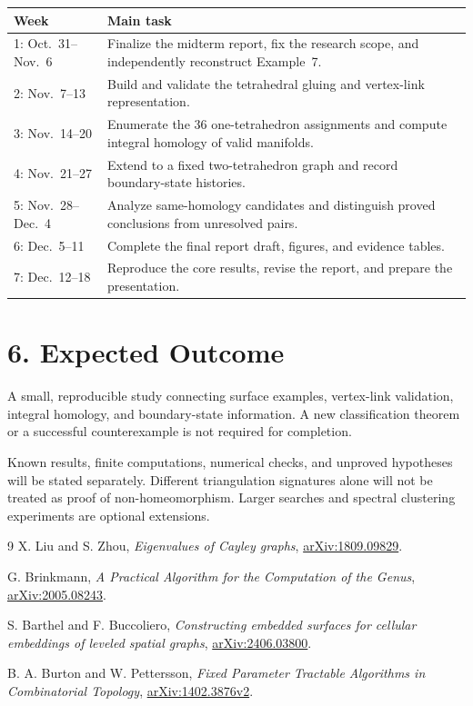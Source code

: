 \documentclass[11pt,a4paper]{article}
\begin{document}
\renewcommand{\arraystretch}{1.35}
\begin{tabularx}{\textwidth}{@{}p{2.8cm}X@{}}
\toprule
\textbf{Week} & \textbf{Main task}\\
\midrule
1: Oct.\ 31--Nov.\ 6 & Finalize the midterm report, fix the research scope, and independently reconstruct Example~7.\\
2: Nov.\ 7--13 & Build and validate the tetrahedral gluing and vertex-link representation.\\
3: Nov.\ 14--20 & Enumerate the $36$ one-tetrahedron assignments and compute integral homology of valid manifolds.\\
4: Nov.\ 21--27 & Extend to a fixed two-tetrahedron graph and record boundary-state histories.\\
5: Nov.\ 28--Dec.\ 4 & Analyze same-homology candidates and distinguish proved conclusions from unresolved pairs.\\
6: Dec.\ 5--11 & Complete the final report draft, figures, and evidence tables.\\
7: Dec.\ 12--18 & Reproduce the core results, revise the report, and prepare the presentation.\\
\bottomrule
\end{tabularx}

\section*{6. Expected Outcome}
A small, reproducible study connecting surface examples, vertex-link validation, integral homology, and boundary-state information. A new classification theorem or a successful counterexample is not required for completion.

Known results, finite computations, numerical checks, and unproved hypotheses will be stated separately. Different triangulation signatures alone will not be treated as proof of non-homeomorphism. Larger searches and spectral clustering experiments are optional extensions.

\begin{thebibliography}{9}
\small
{}
X. Liu and S. Zhou,
\emph{Eigenvalues of Cayley graphs},
\href{https://arxiv.org/abs/1809.09829}{arXiv:1809.09829}.

G. Brinkmann,
\emph{A Practical Algorithm for the Computation of the Genus},
\href{https://arxiv.org/abs/2005.08243}{arXiv:2005.08243}.

S. Barthel and F. Buccoliero,
\emph{Constructing embedded surfaces for cellular embeddings of leveled spatial graphs},
\href{https://arxiv.org/abs/2406.03800}{arXiv:2406.03800}.

B. A. Burton and W. Pettersson,
\emph{Fixed Parameter Tractable Algorithms in Combinatorial Topology},
\href{https://arxiv.org/abs/1402.3876v2}{arXiv:1402.3876v2}.
\end{thebibliography}
\end{document}
